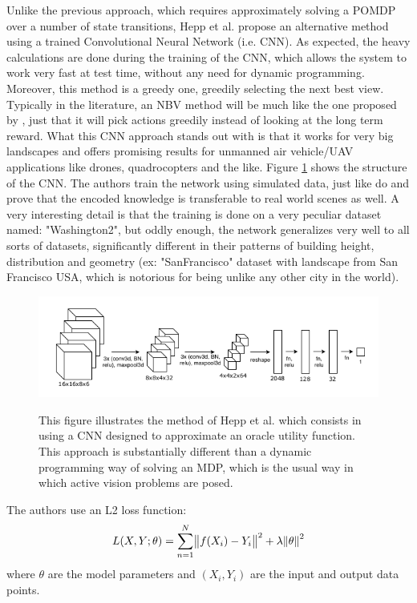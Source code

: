 \documentclass[a4paper,11pt,english]{article}
\begin{document}
Unlike the previous approach, which requires approximately solving a POMDP over a number of state transitions, Hepp et al. \cite{hepp2018learn} propose an alternative method using a trained Convolutional Neural Network (i.e. CNN). As expected, the heavy calculations are done during the training of the CNN, which allows the system to work very fast at test time, without any need for dynamic programming. Moreover, this method is a greedy one, greedily selecting the next best view. Typically in the literature, an NBV method will be much like the one proposed by \cite{atanasov2014nonmyopic}, just that it will pick actions greedily instead of looking at the long term reward. What this CNN approach stands out with is that it works for very big landscapes and offers promising results for unmanned air vehicle/UAV applications like drones, quadrocopters and the like. Figure \ref{heppmethod1} shows the structure of the CNN. The authors train the network using simulated data, just like \cite{atanasov2014nonmyopic} do and prove that the encoded knowledge is transferable to real world scenes as well. A very interesting detail is that the training is done on a very peculiar dataset named: "Washington2", but oddly enough, the network generalizes very well to all sorts of datasets, significantly different in their patterns of building height, distribution and geometry (ex: "SanFrancisco" dataset with landscape from San Francisco USA, which is notorious for being unlike any other city in the world).  
\begin{figure}[H]
  \caption{
  This figure illustrates the method of Hepp et al. \cite{hepp2018learn} which consists in using a CNN designed to approximate an oracle utility function. This approach is substantially different than a dynamic programming way of solving an MDP, which is the usual way in which active vision problems are posed.}
  \centering
    \includegraphics[scale=0.6]{heppmethod1.png}
  \label{heppmethod1}
\end{figure}

The authors use an L2 loss function:
$$L(X,Y;\theta)=\sum_{n=1}^N \norm{f(X_i)-Y_i}^2 + \lambda \norm{\theta}^2$$ where $\theta$ are the model parameters and $(X_i, Y_i)$ are the input and output data points.
\end{document}
